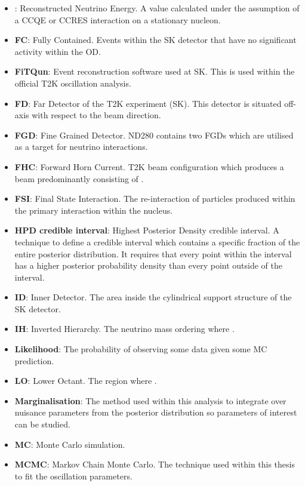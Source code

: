 \begin{itemize}[label={},leftmargin=*]
\item \textbf{}: Reconstructed Neutrino Energy. A value calculated under the assumption of a CCQE or CCRES interaction on a stationary nucleon.
\item \textbf{FC}: Fully Contained. Events within the SK detector that have no significant activity within the OD.
\item \textbf{FiTQun}: Event reconstruction software used at SK. This is used within the official T2K oscillation analysis.
\item \textbf{FD}: Far Detector of the T2K experiment (SK). This detector is situated \quickmath{2.5\deg} off-axis with respect to the beam direction.
\item \textbf{FGD}: Fine Grained Detector. ND280 contains two FGDs which are utilised as a target for neutrino interactions.
\item \textbf{FHC}: Forward Horn Current. T2K beam configuration which produces a beam predominantly consisting of \quickmath{\nu_\mu}.
\item \textbf{FSI}: Final State Interaction. The re-interaction of particles produced within the primary interaction within the nucleus.
\item \textbf{HPD credible interval}: Highest Posterior Density credible interval. A technique to define a credible interval which contains a specific fraction of the entire posterior distribution. It requires that every point within the interval has a higher posterior probability density than every point outside of the interval.
\item \textbf{ID}: Inner Detector. The area inside the cylindrical support structure of the SK detector.
\item \textbf{IH}: Inverted Hierarchy. The neutrino mass ordering where .
\item \textbf{Likelihood}: The probability of observing some data given some MC prediction.
\item \textbf{LO}: Lower Octant. The region where .
\item \textbf{Marginalisation}: The method used within this analysis to integrate over nuisance parameters from the posterior distribution so parameters of interest can be studied.
\item \textbf{MC}: Monte Carlo simulation.  
\item \textbf{MCMC}: Markov Chain Monte Carlo. The technique used within this thesis to fit the oscillation parameters.

\end{itemize}
